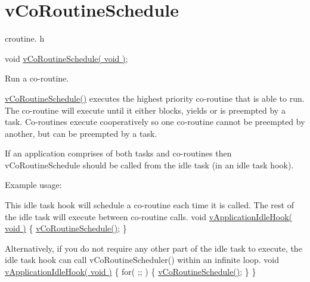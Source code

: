 \hypertarget{group__v_co_routine_schedule}{\section{v\-Co\-Routine\-Schedule}
\label{group__v_co_routine_schedule}
}
croutine. h 
\begin{DoxyPre}
 void \hyperlink{win32_2win32_2_libraries_2_free_r_t_o_s_2_source_2include_2croutine_8h_a5333c649a2c063006ca3cd7a3b5b9240}{vCoRoutineSchedule( void )};\end{DoxyPre}


Run a co-\/routine.

\hyperlink{_common_2_libraries_2_free_r_t_o_s_2_source_2croutine_8c_a5333c649a2c063006ca3cd7a3b5b9240}{v\-Co\-Routine\-Schedule()} executes the highest priority co-\/routine that is able to run. The co-\/routine will execute until it either blocks, yields or is preempted by a task. Co-\/routines execute cooperatively so one co-\/routine cannot be preempted by another, but can be preempted by a task.

If an application comprises of both tasks and co-\/routines then v\-Co\-Routine\-Schedule should be called from the idle task (in an idle task hook).

Example usage\-: 
\begin{DoxyPre}
This idle task hook will schedule a co-routine each time it is called.
The rest of the idle task will execute between co-routine calls.
 void \hyperlink{group___system_module_ga97fd430f36f8b065226e2bff9bad1de5}{vApplicationIdleHook( void )}
 \{
        \hyperlink{_common_2_libraries_2_free_r_t_o_s_2_source_2croutine_8c_a5333c649a2c063006ca3cd7a3b5b9240}{vCoRoutineSchedule()};
 \}\end{DoxyPre}



\begin{DoxyPre}Alternatively, if you do not require any other part of the idle task to
execute, the idle task hook can call vCoRoutineScheduler() within an
infinite loop.
 void \hyperlink{group___system_module_ga97fd430f36f8b065226e2bff9bad1de5}{vApplicationIdleHook( void )}
 \{
    for( ;; )
    \{
        \hyperlink{_common_2_libraries_2_free_r_t_o_s_2_source_2croutine_8c_a5333c649a2c063006ca3cd7a3b5b9240}{vCoRoutineSchedule()};
    \}
 \}
 \end{DoxyPre}
 
